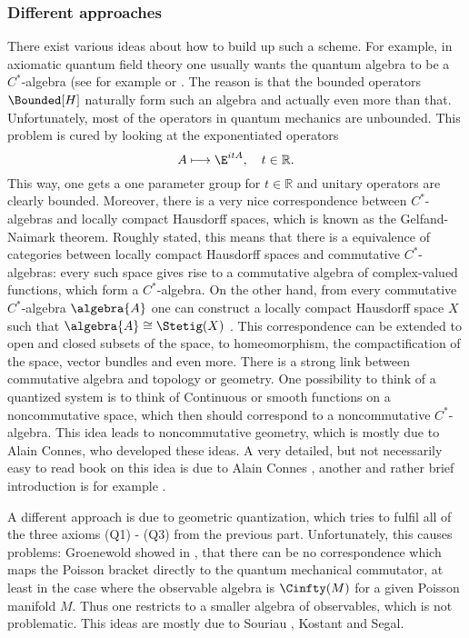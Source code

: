 \subsubsection{Different approaches}
There exist various ideas about how to build up such a scheme. For example, in 
axiomatic quantum field theory one usually wants the quantum algebra to be a 
$C^*$-algebra (see for example \cite{haag:1993a} or 
\cite{baer.ginoux.pfaeffle:2007a}. 
The reason is that the bounded operators $\Bounded[H]$ naturally form such an 
algebra and actually even more than that. Unfortunately, most of the operators 
in quantum mechanics are unbounded. This problem is cured by looking at the 
exponentiated operators
\begin{equation*}
	A
	\longmapsto
	\E^{i t A},
	\quad t \in \mathbb{R}.
\end{equation*}
This way, one gets a one parameter group for $t \in \mathbb{R}$ and unitary 
operators are clearly bounded. Moreover, there is a very nice correspondence 
between $C^*$-algebras and locally compact Hausdorff spaces, which is known as 
the Gelfand-Naimark theorem. Roughly stated, this means that there is a 
equivalence of categories between locally compact Hausdorff spaces and 
commutative $C^*$-algebras: every such space gives rise to a commutative algebra 
of complex-valued functions, which form a $C^*$-algebra. On the other hand, from 
every commutative $C^*$-algebra $\algebra{A}$ one can construct a locally 
compact Hausdorff space $X$ such that $\algebra{A} \cong \Stetig(X)$ . This 
correspondence can be extended to open and closed subsets of the space, to 
homeomorphism, the compactification of the space, vector bundles and even more. 
There is a strong link between commutative algebra and topology or geometry. One 
possibility to think of a quantized system is to think of Continuous or smooth 
functions on a noncommutative space, which then should correspond to a 
noncommutative $C^*$-algebra. This idea leads to noncommutative geometry, which 
is mostly due to Alain Connes, who developed these ideas. A very detailed, but 
not necessarily easy to read book on this idea is due to Alain Connes 
\cite{connes:1994a}, another and rather brief introduction is for example 
\cite{varilly:2006a}.


A different approach is due to geometric quantization, which tries to fulfil all 
of the three axioms (Q1) - (Q3) from the previous part. Unfortunately, this 
causes problems: Groenewold showed in \cite{groenewold:1946a}, that there can be 
no correspondence which maps the Poisson bracket directly to the quantum 
mechanical commutator, at least in the case where the observable algebra is 
$\Cinfty(M)$ for a given Poisson manifold $M$. Thus one restricts to a smaller 
algebra of observables, which is not problematic. This ideas are mostly due 
to Souriau \cite{souriau:1970a}, Kostant and Segal.


